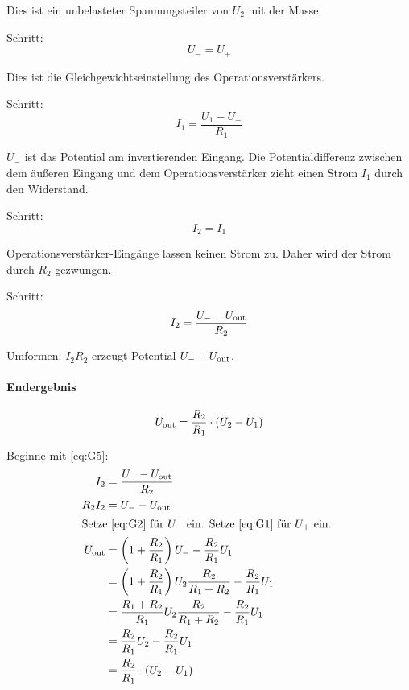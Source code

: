 Dies ist ein unbelasteter Spannungsteiler von $U_2$ mit der Masse.

Schritt:
\begin{equation}
	\label{eq:G2}
	U_- = U_+
\end{equation}

Dies ist die Gleichgewichtseinstellung des Operationsverstärkers.

Schritt:
\begin{equation}
	\label{eq:G3}
	I_1 = \frac{U_1 - U_-}{R_1}
\end{equation}

$U_-$ ist das Potential am invertierenden Eingang. Die Potentialdifferenz
zwischen dem äußeren Eingang und dem Operationsverstärker zieht einen Strom
$I_1$ durch den Widerstand.

Schritt:
\begin{equation}
	\label{eq:G4}
	I_2 = I_1
\end{equation}

Operationsverstärker-Eingänge lassen keinen Strom zu. Daher wird der Strom
durch $R_2$ gezwungen.

Schritt:
\begin{equation}
	\label{eq:G5}
	I_2 = \frac{U_- - U_\text{out}}{R_2}
\end{equation}

Umformen: $I_2 R_2$ erzeugt Potential $U_- - U_\text{out}$.

\paragraph{Endergebnis}
\[
	U_\text{out} = \frac{R_2}{R_1} \cdot (U_2 - U_1)
\]

Beginne mit \eqref{eq:G5}:
\begin{align*}
	I_2 &= \frac{U_- - \Uout}{R_2} \\
	R_2 I_2 &= U_- - \Uout \\
	\intertext{%
		Setze \eqref{eq:G2} für $U_-$ ein. Setze \eqref{eq:G1} für $U_+$ ein.
	}
	\Uout
	&= \del{1 + \frac{R_2}{R_1}} U_- - \frac{R_2}{R_1} U_1 \\
	&= \del{1 + \frac{R_2}{R_1}} U_2 \frac{R_2}{R_1 + R_2} - \frac{R_2}{R_1} U_1 \\
	&= \frac{R_1 + R_2}{R_1} U_2 \frac{R_2}{R_1 + R_2} - \frac{R_2}{R_1} U_1 \\
	&= \frac{R_2}{R_1} U_2 - \frac{R_2}{R_1} U_1 \\
	&= \frac{R_2}{R_1} \cdot (U_2 - U_1)
\end{align*}

